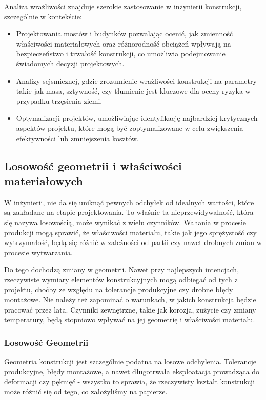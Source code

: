 Analiza wrażliwości znajduje szerokie zastosowanie w inżynierii konstrukcji, szczególnie w kontekście:

\begin{itemize}
    \item Projektowania mostów i budynków pozwalając ocenić, jak zmienność właściwości materiałowych oraz różnorodność obciążeń wpływają na bezpieczeństwo i trwałość konstrukcji, co umożliwia podejmowanie świadomych decyzji projektowych.
    \item Analizy sejsmicznej, gdzie zrozumienie wrażliwości konstrukcji na parametry takie jak masa, sztywność, czy tłumienie jest kluczowe dla oceny ryzyka w przypadku trzęsienia ziemi.
    \item Optymalizacji projektów, umożliwiając identyfikację najbardziej krytycznych aspektów projektu, które mogą być zoptymalizowane w celu zwiększenia efektywności lub zmniejszenia kosztów.
\end{itemize}

\subsection{Losowość geometrii i właściwości materiałowych}

W inżynierii, nie da się uniknąć pewnych odchyłek od idealnych wartości, które są zakładane na etapie projektowania.
To właśnie ta nieprzewidywalność, która się nazywa losowością, może wynikać z wielu czynników.
Wahania w procesie produkcji mogą sprawić, że właściwości materiału, takie jak jego sprężystość czy wytrzymałość, będą się różnić w zależności od partii czy nawet drobnych zmian w procesie wytwarzania.

Do tego dochodzą zmiany w geometrii.
Nawet przy najlepszych intencjach, rzeczywiste wymiary elementów konstrukcyjnych mogą odbiegać od tych z projektu, choćby ze względu na tolerancje produkcyjne czy drobne błędy montażowe.
Nie należy też zapominać o warunkach, w jakich konstrukcja będzie pracować przez lata.
Czynniki zewnętrzne, takie jak korozja, zużycie czy zmiany temperatury, będą stopniowo wpływać na jej geometrię i właściwości materiału.

\subsubsection*{Losowość Geometrii}

Geometria konstrukcji jest szczególnie podatna na losowe odchylenia.
Tolerancje produkcyjne, błędy montażowe, a nawet długotrwała eksploatacja prowadząca do deformacji czy pęknięć - wszystko to sprawia, że rzeczywisty kształt konstrukcji może różnić się od tego, co założyliśmy na papierze.

